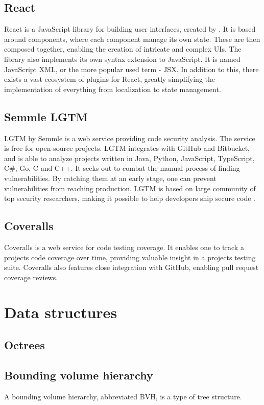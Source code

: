 \subsection{React}
React \cite{react} is a JavaScript library for building user interfaces, created by \citet{facebook}. It is based around components, where each component manage its own state. These are then composed together, enabling the creation of intricate and complex UIs. The library also implements its own syntax extension to JavaScript. It is named JavaScript XML, or the more popular used term - JSX. In addition to this, there exists a vast ecosystem of plugins for React, greatly simplifying the implementation of everything from localization to state management.

\subsection{Semmle LGTM}
LGTM by Semmle \cite{lgtm} is a web service providing code security analysis. The service is free for open-source projects. LGTM integrates with GitHub and Bitbucket, and is able to analyze projects written in Java, Python, JavaScript, TypeScript, C\#, Go, C and C++. It seeks out to combat the manual process of finding vulnerabilities. By catching them at an early stage, one can prevent vulnerabilities from reaching production. LGTM is based on large community of top security researchers, making it possible to help developers ship secure code \cite{lgtm-security}.

\subsection{Coveralls}
Coveralls \cite{coveralls} is a web service for code testing coverage. It enables one to track a projects code coverage over time, providing valuable insight in a projects testing suite. Coveralls also features close integration with GitHub, enabling pull request coverage reviews.

\section{Data structures}
\subsection{Octrees}

\subsection{Bounding volume hierarchy }
A bounding volume hierarchy, abbreviated BVH, is a type of tree structure.

